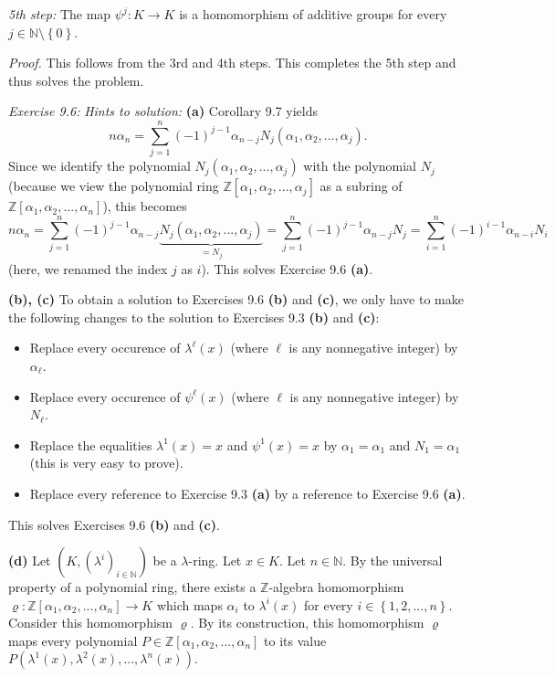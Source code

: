 \documentclass[numbers=enddot,12pt,final,onecolumn,notitlepage]{scrartcl}%
\begin{document}
\textit{5th step:} The map $\psi^{j}:K\rightarrow K$ is a homomorphism of
additive groups for every $j\in\mathbb{N}\setminus\left\{  0\right\}  $.

\textit{Proof.} This follows from the 3rd and 4th steps. This completes the
5th step and thus solves the problem.

\textit{Exercise 9.6:} \textit{Hints to solution:} \textbf{(a)} Corollary 9.7
yields%
\[
n\alpha_{n}=\sum\limits_{j=1}^{n}\left(  -1\right)  ^{j-1}\alpha_{n-j}%
N_{j}\left(  \alpha_{1},\alpha_{2},...,\alpha_{j}\right)  .
\]
Since we identify the polynomial $N_{j}\left(  \alpha_{1},\alpha
_{2},...,\alpha_{j}\right)  $ with the polynomial $N_{j}$ (because we view the
polynomial ring $\mathbb{Z}\left[  \alpha_{1},\alpha_{2},...,\alpha
_{j}\right]  $ as a subring of $\mathbb{Z}\left[  \alpha_{1},\alpha
_{2},...,\alpha_{n}\right]  $), this becomes%
\[
n\alpha_{n}=\sum\limits_{j=1}^{n}\left(  -1\right)  ^{j-1}\alpha
_{n-j}\underbrace{N_{j}\left(  \alpha_{1},\alpha_{2},...,\alpha_{j}\right)
}_{=N_{j}}=\sum\limits_{j=1}^{n}\left(  -1\right)  ^{j-1}\alpha_{n-j}%
N_{j}=\sum_{i=1}^{n}\left(  -1\right)  ^{i-1}\alpha_{n-i}N_{i}%
\]
(here, we renamed the index $j$ as $i$). This solves Exercise 9.6 \textbf{(a)}.

\textbf{(b), (c)} To obtain a solution to Exercises 9.6 \textbf{(b)} and
\textbf{(c)}, we only have to make the following changes to the solution to
Exercises 9.3 \textbf{(b)} and \textbf{(c)}:

\begin{itemize}
\item Replace every occurence of $\lambda^{\ell}\left(  x\right)  $ (where
$\ell$ is any nonnegative integer) by $\alpha_{\ell}$.

\item Replace every occurence of $\psi^{\ell}\left(  x\right)  $ (where $\ell$
is any nonnegative integer) by $N_{\ell}$.

\item Replace the equalities $\lambda^{1}\left(  x\right)  =x$ and $\psi
^{1}\left(  x\right)  =x$ by $\alpha_{1}=\alpha_{1}$ and $N_{1}=\alpha_{1}$
(this is very easy to prove).

\item Replace every reference to Exercise 9.3 \textbf{(a)} by a reference to
Exercise 9.6 \textbf{(a)}.
\end{itemize}

This solves Exercises 9.6 \textbf{(b)} and \textbf{(c)}.

\textbf{(d)} Let $\left(  K,\left(  \lambda^{i}\right)  _{i\in\mathbb{N}%
}\right)  $ be a $\lambda$-ring. Let $x\in K$. Let $n\in\mathbb{N}$. By the
universal property of a polynomial ring, there exists a $\mathbb{Z}$-algebra
homomorphism $\varrho:\mathbb{Z}\left[  \alpha_{1},\alpha_{2},...,\alpha
_{n}\right]  \rightarrow K$ which maps $\alpha_{i}$ to $\lambda^{i}\left(
x\right)  $ for every $i\in\left\{  1,2,...,n\right\}  $. Consider this
homomorphism $\varrho$. By its construction, this homomorphism $\varrho$ maps
every polynomial $P\in\mathbb{Z}\left[  \alpha_{1},\alpha_{2},...,\alpha
_{n}\right]  $ to its value $P\left(  \lambda^{1}\left(  x\right)
,\lambda^{2}\left(  x\right)  ,...,\lambda^{n}\left(  x\right)  \right)  $.
\end{document}
